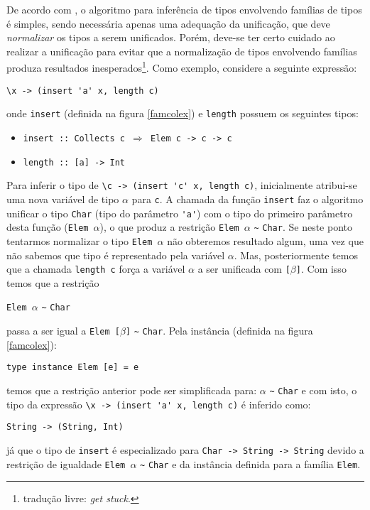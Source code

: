 De acordo com \cite{Schrijvers2008}, o algoritmo para infer\^encia de tipos envolvendo fam\'ilias de tipos \'e simples,
sendo necess\'aria apenas uma adequa\c{c}\~ao da unifica\c{c}\~ao, que deve \emph{normalizar} os tipos a serem 
unificados. Por\'em, deve-se ter certo cuidado ao realizar a unifica\c{c}\~ao para evitar que a normaliza\c{c}\~ao de
tipos envolvendo fam\'ilias produza resultados inesperados\footnote{tradu\c{c}\~ao livre: \emph{get stuck}.}. Como 
exemplo, considere a seguinte express\~ao:
\begin{center}
	\verb|\x -> (insert 'a' x, length c)|
\end{center} 
onde \texttt{insert} (definida na figura \ref{famcolex}) e \texttt{length} possuem os seguintes tipos:
\begin{itemize}
	\item[\ ]\texttt{insert :: Collects c $\Rightarrow$ Elem c -> c -> c}
	\item[\ ]\texttt{length :: [a] -> Int}
\end{itemize}
Para inferir o tipo de \verb|\c -> (insert 'c' x, length c)|, inicialmente atribui-se uma nova vari\'avel de tipo 
$\alpha$ para \texttt{c}. A chamada da fun\c{c}\~ao \texttt{insert} faz o algoritmo unificar o tipo \texttt{Char} 
(tipo do par\^ametro \verb|'a'|) com o tipo do primeiro par\^ametro desta fun\c{c}\~ao (\texttt{Elem $\alpha$}), o
que produz a restri\c{c}\~ao \texttt{Elem $\alpha$} \verb|~| \texttt{Char}. Se neste ponto tentarmos normalizar
o tipo \texttt{Elem $\alpha$} n\~ao obteremos resultado algum, uma vez que n\~ao sabemos que tipo \'e representado pela 
vari\'avel $\alpha$. Mas,  posteriormente temos que a chamada \texttt{length c} for\c{c}a a vari\'avel $\alpha$ a ser 
unificada com \texttt{[$\beta$]}. Com isso temos que a restri\c{c}\~ao 
\begin{center}
	\texttt{Elem $\alpha$} \verb|~| \texttt{Char} 
\end{center}
passa a ser igual a \texttt{Elem [$\beta$]} \verb|~| \texttt{Char}. Pela inst\^ancia (definida na figura 
\ref{famcolex}):
\begin{center}
	\texttt{type instance Elem [e] = e}
\end{center}
temos que a restri\c{c}\~ao anterior pode ser simplificada para: $\alpha$ \verb|~| \texttt{Char} e com isto, o
tipo da express\~ao \verb|\x -> (insert 'a' x, length c)| \'e inferido como:
\begin{center}
	\texttt{String -> (String, Int)}
\end{center} 
j\'a que o tipo de \texttt{insert} \'e especializado para \texttt{Char -> String -> String} devido a restri\c{c}\~ao
de igualdade \texttt{Elem $\alpha$} \verb|~| \texttt{Char}  e da inst\^ancia definida para a fam\'ilia \texttt{Elem}.

